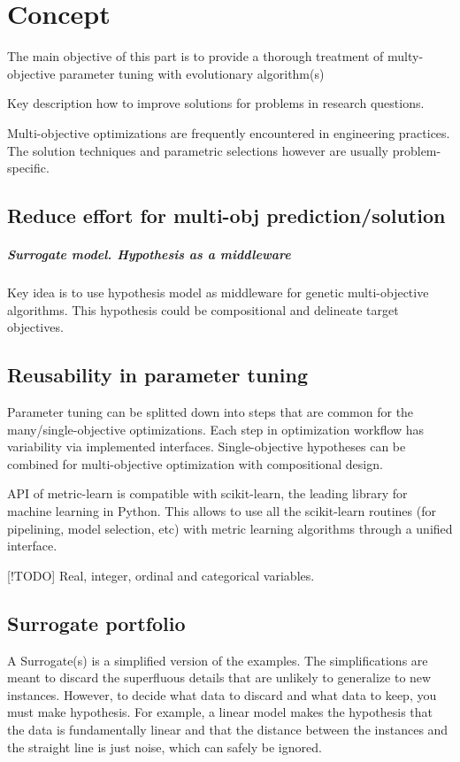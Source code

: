 \chapter{Concept}
The main objective of this part is to provide a thorough treatment of multy-objective parameter tuning with evolutionary algorithm(s)


Key description how to improve solutions for problems in research questions.

Multi-objective optimizations are frequently encountered in
engineering practices. The solution techniques and parametric
selections however are usually problem-specific. \cite{DBLP:journals/corr/abs-1812-07958}

    \section{Reduce effort for multi-obj prediction/solution}
        \paragraph{Surrogate model. Hypothesis as a middleware}
        Key idea is to use hypothesis model as middleware for genetic multi-objective algorithms.
        This hypothesis could be compositional and delineate target objectives. 

    \section{Reusability in parameter tuning}
        Parameter tuning can be splitted down into steps that are common for the many/single-objective optimizations. 
        Each step in optimization workflow has variability via implemented interfaces.
        Single-objective hypotheses can be combined for multi-objective optimization with compositional design.

        API of metric-learn is compatible with scikit-learn, the leading library for machine learning in Python. 
        This allows to use all the scikit-learn routines (for pipelining, model selection, etc) with metric learning algorithms through a unified interface.

        [!TODO] Real, integer, ordinal and categorical variables.

    \section{Surrogate portfolio}
        A Surrogate(s) is a simplified version of the examples. The simplifications are meant to discard the superfluous details that are unlikely to generalize to new instances. 
        However, to decide what data to discard and what data to keep, you must make hypothesis. 
        For example, a linear model makes the hypothesis that the data is fundamentally linear and that the distance between the instances and the straight line is just noise, 
        which can safely be ignored.

